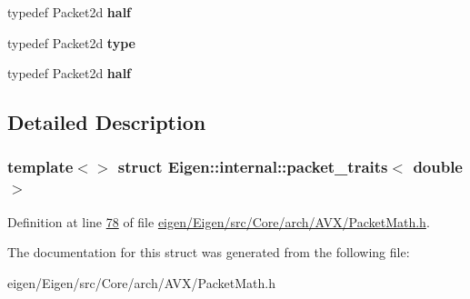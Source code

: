 \begin{DoxyCompactItemize}
typedef Packet2d {\bfseries half}
\item 
\mbox{\label{struct_eigen_1_1internal_1_1packet__traits_3_01double_01_4_af113faa9c4cc1492c8d7b70329940f64}} 
typedef Packet2d {\bfseries type}
\item 
\mbox{\label{struct_eigen_1_1internal_1_1packet__traits_3_01double_01_4_a703f4ec61806f74b62a675bd29cb9349}} 
typedef Packet2d {\bfseries half}
\end{DoxyCompactItemize}


\subsection{Detailed Description}
\subsubsection*{template$<$$>$\newline
struct Eigen\+::internal\+::packet\+\_\+traits$<$ double $>$}



Definition at line \hyperlink{eigen_2_eigen_2src_2_core_2arch_2_a_v_x_2_packet_math_8h_source_l00078}{78} of file \hyperlink{eigen_2_eigen_2src_2_core_2arch_2_a_v_x_2_packet_math_8h_source}{eigen/\+Eigen/src/\+Core/arch/\+A\+V\+X/\+Packet\+Math.\+h}.



The documentation for this struct was generated from the following file\+:\begin{DoxyCompactItemize}
\item 
eigen/\+Eigen/src/\+Core/arch/\+A\+V\+X/\+Packet\+Math.\+h\end{DoxyCompactItemize}
